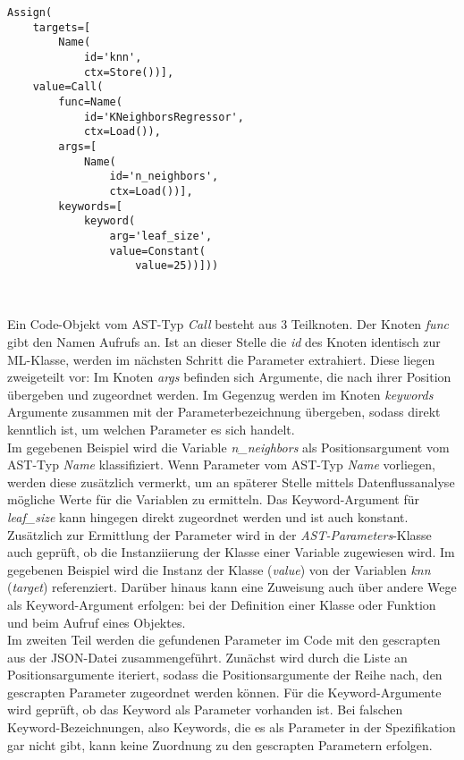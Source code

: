 \documentclass[german,bachelor]{swsLeipzig}
\begin{document}
\begin{lstlisting}[frame=single, basicstyle=\small]
Assign(
    targets=[
        Name(
            id='knn',
            ctx=Store())],
    value=Call(
        func=Name(
            id='KNeighborsRegressor',
            ctx=Load()),
        args=[
            Name(
                id='n_neighbors',
                ctx=Load())],
        keywords=[
            keyword(
                arg='leaf_size',
                value=Constant(
                    value=25))]))
\end{lstlisting}
\

Ein Code-Objekt vom AST-Typ \textit{Call} besteht aus 3 Teilknoten.
Der Knoten \textit{func} gibt den Namen Aufrufs an.
Ist an dieser Stelle die \textit{id} des Knoten identisch zur ML-Klasse, werden im nächsten Schritt die Parameter
extrahiert.
Diese liegen zweigeteilt vor:
Im Knoten \textit{args} befinden sich Argumente, die nach ihrer Position übergeben und zugeordnet werden.
Im Gegenzug werden im Knoten \textit{keywords} Argumente zusammen mit der Parameterbezeichnung übergeben, sodass direkt kenntlich
ist, um welchen Parameter es sich handelt. \\

Im gegebenen Beispiel wird die Variable \textit{n\_neighbors} als Positionsargument vom AST-Typ \textit{Name} klassifiziert.
Wenn Parameter vom AST-Typ \textit{Name} vorliegen, werden diese zusätzlich vermerkt, um an späterer Stelle mittels
Datenflussanalyse mögliche Werte für die Variablen zu ermitteln.
Das Keyword-Argument für \textit{leaf\_size} kann hingegen direkt zugeordnet werden und ist auch konstant. \\

Zusätzlich zur Ermittlung der Parameter wird in der \textit{AST-Parameters}-Klasse auch geprüft, ob die Instanziierung der Klasse
einer Variable zugewiesen wird.
Im gegebenen Beispiel wird die Instanz der Klasse (\textit{value}) von der Variablen \textit{knn} (\textit{target}) referenziert.
Darüber hinaus kann eine Zuweisung auch über andere Wege als Keyword-Argument erfolgen:
bei der Definition einer Klasse oder Funktion und beim Aufruf eines Objektes.\\

Im zweiten Teil werden die gefundenen Parameter im Code mit den gescrapten aus der JSON-Datei zusammengeführt.
Zunächst wird durch die Liste an Positionsargumente iteriert, sodass die Positionsargumente der Reihe nach,
den gescrapten Parameter zugeordnet werden können.
Für die Keyword-Argumente wird geprüft, ob das Keyword als Parameter vorhanden ist.
Bei falschen Keyword-Bezeichnungen, also Keywords, die es als Parameter in der Spezifikation gar nicht gibt,
kann keine Zuordnung zu den gescrapten Parametern erfolgen. \\
\end{document}
